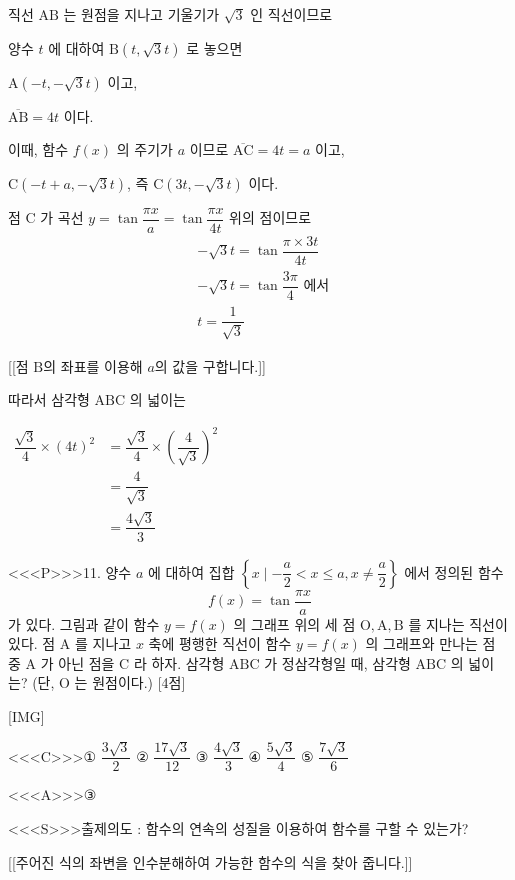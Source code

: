 \documentclass{oblivoir}
\begin{document}
직선 $\mathrm{AB}$ 는 원점을 지나고 기울기가 $\sqrt{3}$
인 직선이므로

양수 $t$ 에 대하여
$\mathrm{B}(t, \sqrt{3} t)$ 로 놓으면

$\mathrm{A}(-t,-\sqrt{3} t)$ 이고,

$\overline{\mathrm{AB}}=4 t$ 이다.

이때, 함수 $f(x)$ 의 주기가 $a$ 이므로
$\overline{\mathrm{AC}}=4 t=a$ 이고,

$\mathrm{C}(-t+a,-\sqrt{3} t)$, 즉 $\mathrm{C}(3 t,-\sqrt{3} t)$ 이다.

점 $\mathrm{C}$ 가 곡선 $y=\tan \dfrac{\pi x}{a}=\tan \dfrac{\pi x}{4 t}$ 위의 점이므로
$$
\begin{aligned}
&-\sqrt{3} t=\tan \dfrac{\pi \times 3 t}{4 t} \\
&-\sqrt{3} t=\tan \dfrac{3 \pi}{4} \text { 에서 } \\
&t=\dfrac{1}{\sqrt{3}}
\end{aligned}
$$

[[점 $\mathrm{B}$의 좌표를 이용해 $a$의 값을 구합니다.]]

따라서 삼각형 $\mathrm{ABC}$ 의 넓이는

$
\begin{aligned}
\dfrac{\sqrt{3}}{4} \times(4 t)^{2} &=\dfrac{\sqrt{3}}{4} \times\left(\dfrac{4}{\sqrt{3}}\right)^{2} \\
&=\dfrac{4}{\sqrt{3}} \\
&=\dfrac{4 \sqrt{3}}{3}
\end{aligned}
$


<<<P>>>11. 양수 $a$ 에 대하여 집합 $\left\{x \mid-\dfrac{a}{2}<  x \leq a, x \neq \dfrac{a}{2}\right\}$ 에서 정의된 함수
$$
f(x)=\tan \dfrac{\pi x}{a}
$$
가 있다. 그림과 같이 함수 $y=f(x)$ 의 그래프 위의 세 점 $\mathrm{O}, \mathrm{A}, \mathrm{B}$ 를 지나는 직선이 있다. 점 $\mathrm{A}$ 를 지나고 $x$ 축에 평행한 직선이 함수 $y=f(x)$ 의 그래프와 만나는 점 중 $\mathrm{A}$ 가 아닌 점을 $\mathrm{C}$ 라 하자. 삼각형 $\mathrm{ABC}$ 가 정삼각형일 때, 삼각형 $\mathrm{ABC}$ 의 넓이는? (단, $\mathrm{O}$ 는 원점이다.) [4점]

[IMG]

<<<C>>>① $\dfrac{3 \sqrt{3}}{2}$
② $\dfrac{17 \sqrt{3}}{12}$
③ $\dfrac{4 \sqrt{3}}{3}$
④ $\dfrac{5 \sqrt{3}}{4}$
⑤ $\dfrac{7 \sqrt{3}}{6}$


<<<A>>>③

<<<S>>>출제의도 : 함수의 연속의 성질을 이용하여 함수를 구할 수 있는가?

[[주어진 식의 좌변을 인수분해하여 가능한 함수의 식을 찾아 줍니다.]]
\end{document}
